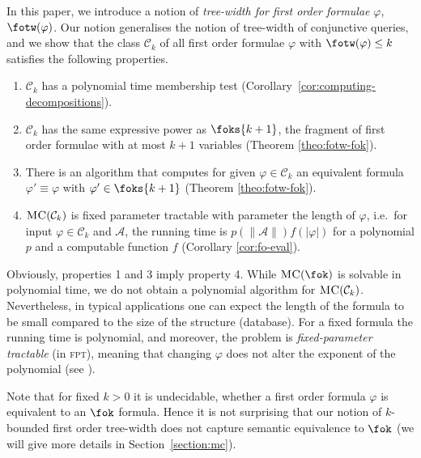 \documentclass{LMCS}
\renewcommand{\phi}{\varphi}
\newcommand{\fpt}{\textsc{fpt}}
\newcommand{\mc}{\textsc{MC}}
\begin{document}
In this paper, we introduce a notion of \emph{tree-width for first order formulae}
$\phi$, $\fotw(\phi)$. Our notion generalises the notion of tree-width of conjunctive queries, and
we show that the class $\mathcal C_k$ of all first order formulae $\phi$ with $\fotw(\phi)\leq k$
satisfies the following properties.
\begin{enumerate}[(1)]
\item $\mathcal C_k$ has a polynomial time membership test 
		(Corollary~\ref{cor:computing-decompositions}).
\item $\mathcal C_k$ has the same expressive power as $\foks{k+1}$, 
		the fragment of
		first order formulae with at most $k+1$ 
		variables (Theorem \ref{theo:fotw-fok}). 
	\item There is an algorithm that computes for given $\phi\in\mathcal C_k$
		an equivalent formula $\phi'\equiv \phi$ with $\phi'\in\foks{k+1}$ 
		(Theorem \ref{theo:fotw-fok}).
	\item $\mc(\mathcal C_k)$ is fixed parameter tractable 
		with parameter the length of $\phi$, i.e.\ for input $\phi\in\mathcal C_k$
		and $\mathcal A$, the running time is $p(\|\mathcal A\|)f(\left|\phi\right|)$
		for a polynomial $p$ and a computable function $f$ (Corollary \ref{cor:fo-eval}).
\end{enumerate}
Obviously, properties 1 and 3 imply property 4.
While $\mc(\fok)$ is solvable in polynomial time, 
we do not obtain a polynomial algorithm for $\mc(\mathcal C_k)$. 
Nevertheless, in typical applications one can expect the length
of the formula to be small compared to the size of the structure (database).
For a fixed formula the running time is polynomial, and moreover, the problem
is \emph{fixed-parameter tractable} (in \fpt), 
meaning that changing $\phi$ 
does not alter the exponent of the polynomial (see \cite{DF99,FG06}).

Note that for fixed $k>0$ it is undecidable, whether a first order formula
$\phi$ is equivalent to an $\fok$ formula.
Hence it is not surprising that our notion of $k$-bounded first order tree-width does not capture 
semantic equivalence to $\fok$ (we will give more details in Section~\ref{section:mc}). 
\end{document}
